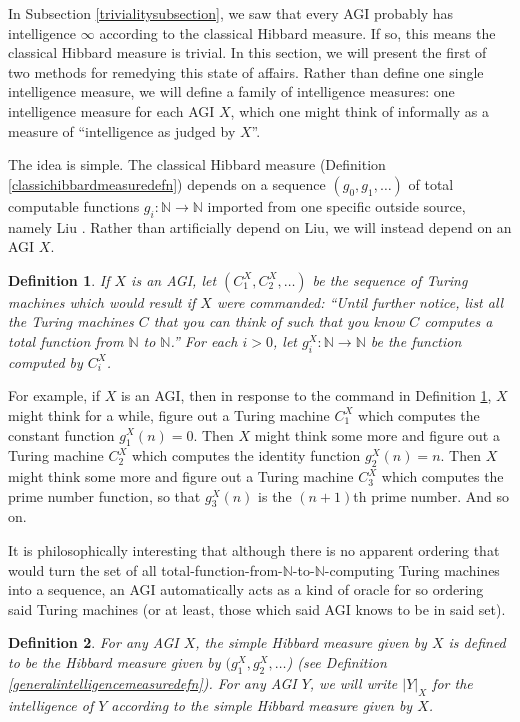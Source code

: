 \documentclass{article}
\newtheorem{definition}{Definition}
\begin{document}
In Subsection \ref{trivialitysubsection}, we saw that every AGI probably has
intelligence $\infty$ according to the classical Hibbard measure. If so, this
means the classical Hibbard measure is trivial. In this section, we will present
the first of two methods for remedying this state of affairs. Rather than define
one single intelligence measure, we will define a family of intelligence measures:
one intelligence measure for each AGI $X$, which one might think of informally as
a measure of ``intelligence as judged by $X$''.

The idea is simple. The classical Hibbard measure
(Definition \ref{classichibbardmeasuredefn}) depends on a sequence $(g_0,g_1,\ldots)$
of total computable functions $g_i:\mathbb N\to\mathbb N$ imported from one specific
outside source, namely Liu \cite{liu1960enumeration}. Rather than artificially depend
on Liu, we will instead depend on an AGI $X$.

\begin{definition}
\label{functionlistdefinition}
    If $X$ is an AGI, let $(C^X_1, C^X_2, \ldots)$ be the sequence of
    Turing machines which would result if $X$ were commanded: ``Until further
    notice, list all the Turing machines $C$ that you can think of such that
    you know $C$ computes a total function from $\mathbb N$ to $\mathbb N$.''
    For each $i>0$, let $g^X_i:\mathbb N\to\mathbb N$ be the function computed by
    $C^X_i$.
\end{definition}

For example, if $X$ is an AGI, then in response to the command in Definition
\ref{functionlistdefinition}, $X$ might think for a while, figure out a Turing
machine $C^X_1$ which computes the constant function $g^X_1(n)=0$. Then $X$
might think some more and figure out a Turing machine $C^X_2$ which computes
the identity function $g^X_2(n)=n$. Then $X$ might think some more and figure
out a Turing machine $C^X_3$ which computes the prime number function, so that
$g^X_3(n)$ is the $(n+1)$th prime number. And so on.

It is philosophically interesting that although there is no apparent ordering that
would turn the set of all total-function-from-$\mathbb N$-to-$\mathbb N$-computing
Turing machines into a sequence, an AGI automatically acts as a kind of oracle for
so ordering said Turing machines (or at least, those which said AGI knows to be in
said set).

\begin{definition}
    For any AGI $X$, the \emph{simple Hibbard measure given by $X$}
    is defined to be the Hibbard measure given by
    $(g^X_1,g^X_2,\ldots$) (see Definition \ref{generalintelligencemeasuredefn}).
    For any AGI $Y$, we will write $|Y|_X$ for the intelligence of $Y$
    according to the simple Hibbard measure given by $X$.
\end{definition}
\end{document}
